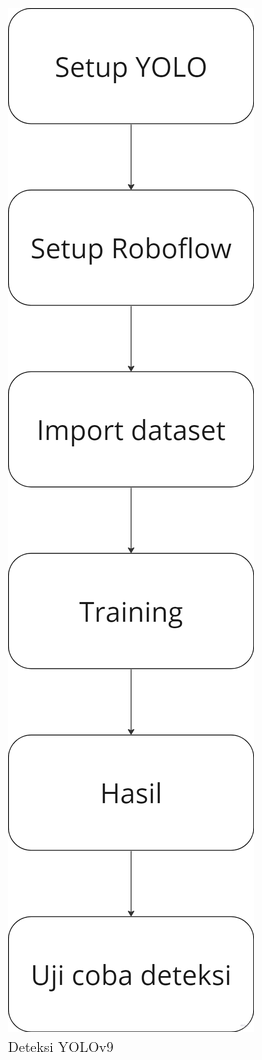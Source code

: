 \begin{figure} [H] \centering
  \includegraphics[scale=0.1]{gambar/bab3/deteksiyolo.png}
  \caption{Deteksi YOLOv9}
  \label{fig:deteksiyolo}
\end{figure}

